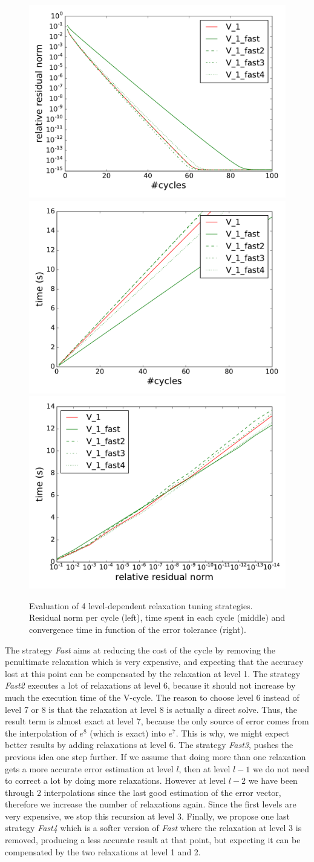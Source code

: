 \begin{figure}
    \includegraphics[width=0.33\linewidth]{figs/convergence_fast_norm.pdf}
    \includegraphics[width=0.33\linewidth]{figs/convergence_fast_time.pdf}
    \includegraphics[width=0.33\linewidth]{figs/time_convergence_fast.pdf}
    \caption{Evaluation of 4 level-dependent relaxation tuning strategies.
    Residual norm per cycle (left), time spent in each cycle (middle) and
    convergence time in function of the error tolerance (right).}
    \label{fig.newstrat}
\end{figure}

The strategy \emph{Fast} aims at reducing the cost of the cycle by removing the
penultimate relaxation which is very expensive, and expecting that the accuracy
lost at this point can be compensated by the relaxation at level 1.  The
strategy \emph{Fast2} executes a lot of relaxations at level 6, because it
should not increase by much the execution time of the V-cycle.  The reason to
choose level 6 instead of level 7 or 8 is that the relaxation at level 8 is
actually a direct solve. Thus, the result term is almost exact at level 7,
because the only source of error comes from the interpolation of $e^8$ (which
is exact) into $e^7$. This is why, we might expect better results by adding
relaxations at level 6. The strategy \emph{Fast3}, pushes the previous idea one
step further. If we assume that doing more than one relaxation gets a more
accurate error estimation at level $l$, then at level $l-1$ we do not need to
correct a lot by doing more relaxations. However at level $l-2$ we have been
through 2 interpolations since the last good estimation of the error vector,
therefore we increase the number of relaxations again. Since the first levels
are very expensive, we stop this recursion at level 3.  Finally, we propose one
last strategy \emph{Fast4} which is a softer version of \emph{Fast} where the
relaxation at level 3 is removed, producing a less accurate result at that
point, but expecting it can be compensated by the two relaxations at level 1
and 2.

